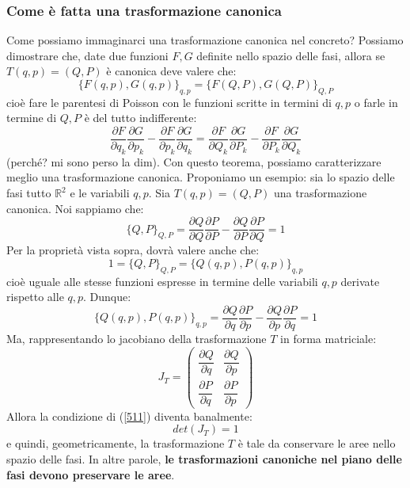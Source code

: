 \documentclass[a4paper,openany]{article}
\begin{document}
	\subsubsection{Come è fatta una trasformazione canonica}
	Come possiamo immaginarci una trasformazione canonica nel concreto? Possiamo dimostrare che, date due funzioni $F,G$ definite nello spazio delle fasi, allora se $T(q,p)=(Q,P)$ è canonica deve valere che:
	$$
	\{F(q,p),G(q,p)\}_{q,p} = \{F(Q,P),G(Q,P)\}_{Q,P}
	$$
	cioè fare le parentesi di Poisson con le funzioni scritte in termini di $q,p$ o farle in termine di $Q,P$ è del tutto indifferente:
	\begin{equation}\label{key}
		\dfrac{\partial F}{\partial q_k}\dfrac{\partial G}{\partial p_k}-\dfrac{\partial F}{\partial p_k}\dfrac{\partial G}{\partial q_k} = \dfrac{\partial F}{\partial Q_k}\dfrac{\partial G}{\partial P_k}-\dfrac{\partial F}{\partial P_k}\dfrac{\partial G}{\partial Q_k}
	\end{equation}
	(perché? mi sono perso la dim). Con questo teorema, possiamo caratterizzare meglio una trasformazione canonica. Proponiamo un esempio: sia lo spazio delle fasi tutto $\mathbb{R}^2$ e le variabili $q,p$. Sia $T(q,p)=(Q,P)$ una trasformazione canonica. Noi sappiamo che:
	$$
	\{Q,P\}_{Q,P} = \dfrac{\partial Q}{\partial Q}\dfrac{\partial P}{\partial P} - \dfrac{\partial Q}{\partial P}\dfrac{\partial P}{\partial Q} = 1
	$$
	Per la proprietà vista sopra, dovrà valere anche che:
	$$
	1 = \{Q,P\}_{Q,P} = \{Q(q,p),P(q,p)\}_{q,p}
	$$
	cioè uguale alle stesse funzioni espresse in termine delle variabili $q,p$ derivate rispetto alle $q,p$. Dunque:
	\begin{equation}
		\{Q(q,p),P(q,p)\}_{q,p} = \dfrac{\partial Q}{\partial q}\dfrac{\partial P}{\partial p}-\dfrac{\partial Q}{\partial p}\dfrac{\partial P}{\partial q}=1
		\label{511}
	\end{equation}
	Ma, rappresentando lo jacobiano della trasformazione $T$ in forma matriciale:
	\begin{equation}\label{key}
		J_{T} =
		\begin{pmatrix}
			\dfrac{\partial Q}{\partial q} & \dfrac{\partial Q}{\partial p} \\
			\dfrac{\partial P}{\partial q} &
			\dfrac{\partial P}{\partial p}
		\end{pmatrix}
	\end{equation}
	Allora la condizione di (\ref{511}) diventa banalmente:
	\begin{equation}\label{key}
		det(J_{T})=1
	\end{equation}
	e quindi, geometricamente, la trasformazione $T$ è tale da conservare le aree nello spazio delle fasi. In altre parole, \textbf{le trasformazioni canoniche nel piano delle fasi devono preservare le aree}.
\end{document}
